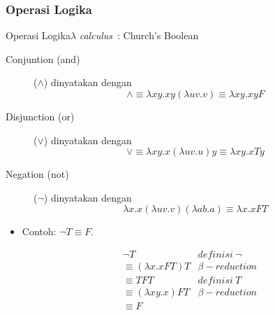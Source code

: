 \documentclass[aspectratio=1610,10pt,handout]{beamer}
\newcommand{\lc}{$\lambda$ {\it calculus}\ }
\begin{document}
\subsubsection{Operasi Logika}
\begin{frame}{Operasi Logika}{\lc: Church's Boolean}

	\begin{description}
		\item [Conjuntion (and)] ($\wedge$) dinyatakan dengan
		$$\wedge \equiv \lambda xy. xy(\lambda uv. v) \equiv  \lambda xy. xyF$$
		\item [Disjunction (or)] ($\vee$) dinyatakan dengan
		$$\vee  \equiv \lambda xy.x(\lambda uv.u)y \equiv \lambda xy.xTy$$
		\item [Negation (not)] ($\neg$) dinyatakan dengan
		$$ \lambda x.x(\lambda uv.v)(\lambda ab.a) \equiv  \lambda x.xFT $$
	\end{description}
	\pause
	\begin{itemize}
		\item Contoh: $\neg T \equiv F$.

		\[
		\begin{array}{lr}
		\neg T & definisi\ \neg  \\
		\equiv (\lambda x.xFT) T  & \beta-reduction \\
		\equiv TFT & definisi\ T \\
		\equiv (\lambda xy. x) F T & \beta-reduction  \\
		\equiv F  &  \\
		\end{array}
		\]

	\end{itemize}
\end{frame}
\end{document}
